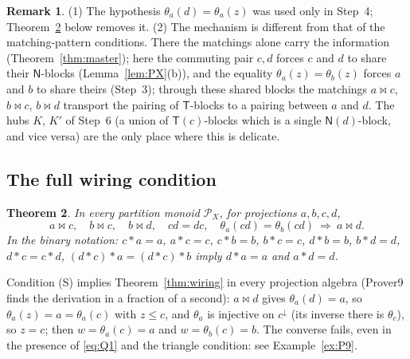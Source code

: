 \documentclass[11pt]{amsart}
\newtheorem{theorem}{Theorem}[section]
\theoremstyle{definition}
\newtheorem{remark}[theorem]{Remark}
\renewcommand{\P}{\mathcal{P}}
\newcommand{\T}{\mathsf{T}}
\newcommand{\N}{\mathsf{N}}
\newcommand{\mt}{\bowtie}   %
\begin{document}
\begin{remark}\label{rem:wiring}
(1) The hypothesis $\theta_a(d)=\theta_a(z)$ was used only in Step~4; Theorem~\ref{thm:S} below removes it. (2) The mechanism is different from that of the matching-pattern conditions. There the matchings alone carry the information (Theorem~\ref{thm:master}); here the commuting pair $c,d$ forces $c$ and $d$ to share their $\N$-blocks (Lemma~\ref{lem:PX}(b)), and the equality $\theta_a(z)=\theta_b(z)$ forces $a$ and $b$ to share theirs (Step~3); through these shared blocks the matchings $a\mt c$, $b\mt c$, $b\mt d$ transport the pairing of $\T$-blocks to a pairing between $a$ and $d$. The hubs $K$, $K'$ of Step~6 (a union of $\T(c)$-blocks which is a single $\N(d)$-block, and vice versa) are the only place where this is delicate.
\end{remark}

\subsection{The full wiring condition}\label{subsec:S}

\begin{theorem}\label{thm:S}
In every partition monoid $\P_X$, for projections $a,b,c,d$,
\[
a\mt c,\quad b\mt c,\quad b\mt d,\quad cd=dc,\quad \theta_a(cd)=\theta_b(cd)\ \Longrightarrow\ a\mt d .
\tag{S}
\]
In the binary notation: $c*a=a$, $a*c=c$, $c*b=b$, $b*c=c$, $d*b=b$, $b*d=d$, $d*c=c*d$, $(d*c)*a=(d*c)*b$ imply $d*a=a$ and $a*d=d$.
\end{theorem}

Condition (S) implies Theorem~\ref{thm:wiring} in every projection algebra (Prover9 finds the derivation in a fraction of a second): $a\mt d$ gives $\theta_a(d)=a$, so $\theta_a(z)=a=\theta_a(c)$ with $z\le c$, and $\theta_a$ is injective on $c^{\downarrow}$ (its inverse there is $\theta_c$), so $z=c$; then $w=\theta_a(c)=a$ and $w=\theta_b(c)=b$. The converse fails, even in the presence of \eqref{eq:Q1} and the triangle condition: see Example~\ref{ex:P9}.
\end{document}
